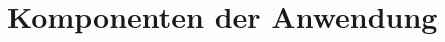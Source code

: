 \label{chap:application_components}


\section{Komponenten der Anwendung}


\newpage

\newpage

\newpage
%
%
